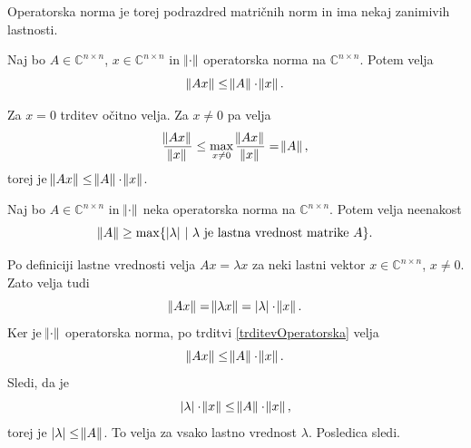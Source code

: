 \documentclass[mat1]{fmfdelo}
\newcommand{\C}{\mathbb C}
\begin{document}
Operatorska norma je torej podrazdred matričnih norm in ima nekaj zanimivih lastnosti.
\begin{trditev}\label{trditevOperatorska}
    Naj bo $A \in \C^{n \times n}$, $x \in \C^{n \times n}$ in $\norm{\cdot}$ operatorska norma na $\C^{n \times n}$. Potem velja
    \begin{equation*}
        \norm{A x} \leq \norm{A} \cdot \norm{x}.
    \end{equation*}
\end{trditev}
\begin{dokaz}
    Za $x = 0$ trditev očitno velja. Za $x \neq 0$ pa velja
    \begin{equation*}
        \frac{\norm{A x}}{\norm{x}} \leq \max_{x \neq 0} \frac{\norm{A x}}{\norm{x}} = \norm{A},
    \end{equation*}
    torej je $\norm{A x} \leq \norm{A} \cdot \norm{x}$.
\end{dokaz}
\begin{posledica}\label{posledicaOperatorskaNorma}
    Naj bo $A \in \C^{n \times n}$ in $\norm{\cdot}$ neka operatorska norma na $\C^{n \times n}$. Potem velja neenakost
    \begin{equation*}
        \norm{A} \geq \max\{|\lambda|\ |\ \lambda\  \text{je lastna vrednost matrike}\  A\}.
    \end{equation*}
\end{posledica}
\begin{dokaz}
    Po definiciji lastne vrednosti velja $A x = \lambda x$ za neki lastni vektor $x \in \C^{n \times n}$, $x \neq 0 $. Zato velja tudi
    \begin{equation*}
        \norm{A x} = \norm{\lambda x} = |\lambda|\cdot \norm{x}.
    \end{equation*}    
    Ker je $\norm{\cdot}$ operatorska norma, po trditvi \ref{trditevOperatorska} velja
    \begin{equation*}
        \norm{A x} \leq \norm{A} \cdot \norm{x}.
    \end{equation*}
    Sledi, da je
    \begin{equation*}
        |\lambda|\cdot \norm{x} \leq \norm{A} \cdot \norm{x},
    \end{equation*}
    torej je $|\lambda| \leq \norm{A}$. To velja za vsako lastno vrednost $\lambda$. Posledica sledi.
\end{dokaz}
\end{document}
